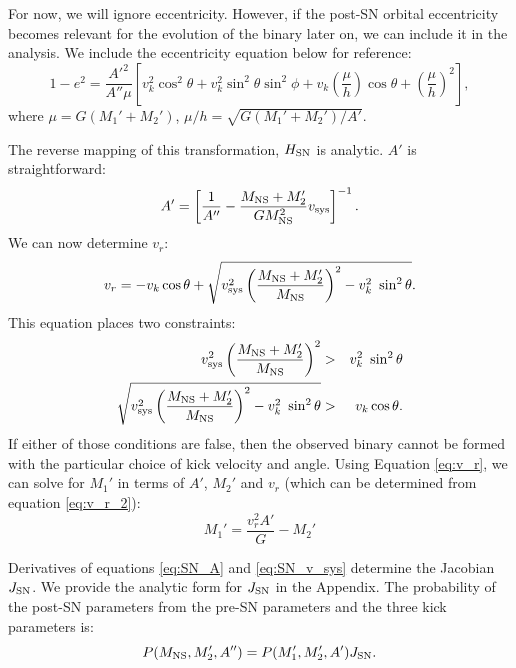\documentclass[12pt, preprint]{aastex}
\begin{document}
For now, we will ignore eccentricity. However, if the post-SN orbital eccentricity becomes relevant for the evolution of the binary later on, we can include it in the analysis. We include the eccentricity equation below for reference:
\begin{equation}
1-e^2 = \frac{A'^2}{A'' \mu} \left[ v_k^2 \cos^2\theta + v_k^2 \sin^2 \theta \sin^2 \phi + v_k \left( \frac{\mu}{h} \right) \cos \theta + \left( \frac{\mu}{h} \right)^2  \right], \label{eq:SN_e}
\end{equation}
where $\mu = G(M_1' + M_2')$, $\mu/h = \sqrt{G(M_1'+M_2') / A'}$.

The reverse mapping of this transformation, $H_{\rm SN}$ is analytic. $A'$ is straightforward:
\begin{equation}
A' = \left[ \frac{1}{A''} - \frac{M_{\rm NS} + M_2'}{G M_{\rm NS}^2} v_{\rm sys} \right]^{-1}.
\end{equation}
We can now determine $v_r$:
\begin{equation}
v_r = -v_k \cos \theta + \sqrt{v_{\rm sys}^2 \left( \frac{M_{\rm NS} + M_2'}{M_{\rm NS}} \right)^2 - v_k^2\ \sin^2 \theta}. \label{eq:v_r_2}
\end{equation}
This equation places two constraints:
\begin{eqnarray}
v_{\rm sys}^2 \left( \frac{M_{\rm NS} + M_2'}{M_{\rm NS}} \right)^2 &>& v_k^2\ \sin^2 \theta \\ 
\sqrt{v_{\rm sys}^2 \left( \frac{M_{\rm NS} + M_2'}{M_{\rm NS}} \right)^2 - v_k^2\ \sin^2 \theta} &>& v_k \cos \theta.
\end{eqnarray}
If either of those conditions are false, then the observed binary cannot be formed with the particular choice of kick velocity and angle. Using Equation \ref{eq:v_r}, we can solve for $M_1'$ in terms of $A'$, $M_2'$ and $v_r$ (which can be determined from equation \ref{eq:v_r_2}):
\begin{equation}
M_1' = \frac{v_r^2 A'}{G} - M_2'
\end{equation}


Derivatives of equations \ref{eq:SN_A} and \ref{eq:SN_v_sys} determine the Jacobian $J_{\rm SN}$. We provide the analytic form for $J_{\rm SN}$ in the Appendix. The probability of the post-SN parameters from the pre-SN parameters and the three kick parameters is:
\begin{equation}
P(M_{\rm NS}, M_2', A'') = P(M_1', M_2', A') J_{\rm SN}. \label{eq:P_SN}
\end{equation}
\end{document}
